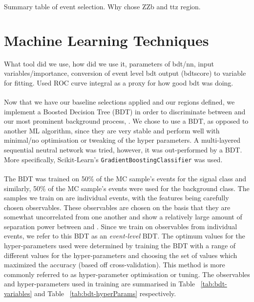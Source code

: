 Summary table of event selection. Why chose ZZb and ttz region. 


\section{Machine Learning Techniques}
What tool did we use, how did we use it, parameters of bdt/nn, input variables/importance, conversion of event level bdt output (bdtscore) to variable for fitting. Used ROC curve integral as a proxy for how good bdt was doing.\\\\

Now that we have our baseline selections applied and our regions defined, we implement a Boosted Decision Tree (BDT) in order to discriminate between \tWZ and our most prominent background process, \ttZ. We chose to use a BDT, as opposed to another ML algorithm, since they are very stable and perform well with minimal/no optimisation or tweaking of the hyper parameters. A multi-layered sequential neutral network was tried, however, it was out-performed by a BDT. More specifically, Scikit-Learn's \texttt{GradientBoostingClassifier} was used.\\\\
The BDT was trained on 50$\%$ of the \tWZ MC sample's events for the signal class and similarly, 50$\%$ of the \ttZ MC sample's events were used for the background class. The samples we train on are individual events, with the features being carefully chosen observables. These observables are chosen on the basis that they are somewhat uncorrelated from one another and show a relatively large amount of separation power between \tWZ and \ttZ. Since we train on observables from individual events, we refer to this BDT as an \textit{event-level} BDT. The optimum values for the hyper-parameters used were determined by training the BDT with a range of different values for the hyper-parameters and choosing the set of values which maximized the accuracy (based off cross-validation). This method is more commonly referred to as hyper-parameter optimisation or tuning. The observables and hyper-parameters used in training are summarised in Table ~\ref{tab:bdt-variables} and Table ~\ref{tab:bdt-hyperParams} respectively.
\pagebreak



